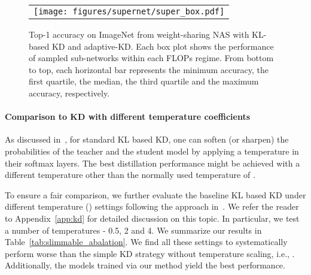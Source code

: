\documentclass{article}
\begin{document}
\begin{figure*}[t]
\vspace{1em}
\begin{tabular}{c}
\raisebox{3em}{\rotatebox{90}{\small Validation Accuracy}}
\texttt{[image: figures/supernet/super\_box.pdf]}  \\
\end{tabular}
\caption{Top-1 accuracy on ImageNet from weight-sharing NAS with KL-based KD and adaptive-KD. Each box plot shows the performance of sampled sub-networks within each FLOPs regime. From bottom to top, each horizontal bar represents the minimum accuracy, the first quartile, the median, the third quartile and the maximum accuracy, respectively. }
\label{fig:supernet_boxplot}
\end{figure*}

\paragraph{Comparison to KD with different temperature coefficients}
As discussed in~\citet{hinton2015distilling}, 
for standard KL based KD, one can soften (or sharpen) the probabilities of the teacher and the student model by applying a temperature in their softmax layers. The best distillation performance might be achieved with a different temperature other than the normally used temperature of . 

To ensure a fair comparison,  
we further evaluate the baseline KL based KD under different temperature () settings following the approach in~\citet{hinton2015distilling}. We refer the reader to  Appendix~\ref{app:kd} for detailed discussion on this topic.
In particular, we test a number of temperatures - 0.5, 2 and 4. 
We summarize our results in Table~\ref{tab:slimmable_abalation}.
We find all these settings to systematically perform worse 
than the simple KD strategy without temperature scaling, i.e., . 
Additionally, the models trained via our method yield the best performance. 
\end{document}
